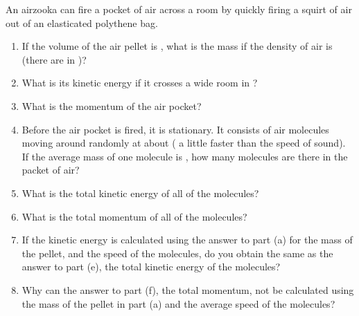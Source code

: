 
\begin{problem}[Robin9]
{An airzooka can fire a pocket of air across a room by quickly firing a squirt of air out of an elasticated polythene bag. 
\begin{enumerate}
	\item If the volume of the air pellet is , what is the mass if the density of air is  (there are  in )?
	\item What is its kinetic energy if it crosses a  wide room in ?
	\item What is the momentum of the air pocket?
	\item Before the air pocket is fired, it is stationary.  It consists of air molecules moving around randomly at about  ( a little faster than the speed of sound).  If the average mass of one molecule is , how many molecules are there in the  packet of air?
	\item What is the total kinetic energy of all of the molecules?
	\item What is the total momentum of all of the molecules?
	\item If the kinetic energy is calculated using the answer to part (a) for the mass of the pellet, and the  speed of the molecules, do you obtain the same as the answer to part (e), the total kinetic energy of the molecules?
	\item Why can the answer to part (f), the total momentum, not be calculated using the mass of the pellet in part (a) and the  average speed of the molecules?
\end{enumerate}
}
{}
{}
\end{problem}